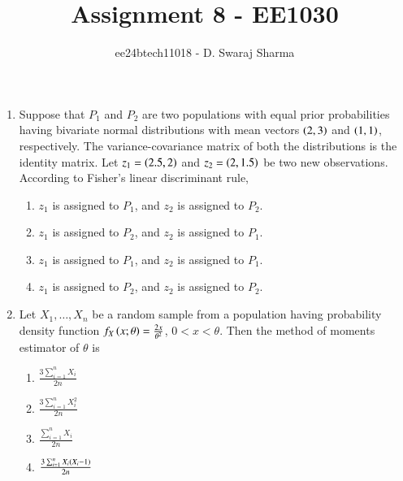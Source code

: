 \documentclass[journal]{IEEEtran}
\begin{document}

\vspace{3cm}

\title{Assignment 8 - EE1030}
\author{ee24btech11018 - D. Swaraj Sharma}

{\let\newpage\relax\maketitle}
\renewcommand{\thefigure}{\theenumi}
\renewcommand{\thetable}{\theenumi}
\setlength{\intextsep}{10pt}
\renewcommand{\thetable}{\theenumi}

\begin{enumerate}
	\item Suppose that $P_1$ and $P_2$ are two populations with equal prior probabilities having bivariate normal distributions with mean vectors $\left(2, 3\right)$ and $\left(1, 1\right)$, respectively. The variance-covariance matrix of both the distributions is the identity matrix. Let $z_1 = \left(2.5, 2\right)$ and $z_2 = \left(2, 1.5\right)$ be two new observations. According to Fisher's linear discriminant rule,
		\begin{enumerate}
			\item $z_1$ is assigned to $P_1$, and $z_2$ is assigned to $P_2$.
			\item $z_1$ is assigned to $P_2$, and $z_2$ is assigned to $P_1$.
			\item $z_1$ is assigned to $P_1$, and $z_2$ is assigned to $P_1$.
			\item $z_1$ is assigned to $P_2$, and $z_2$ is assigned to $P_2$.
		\end{enumerate}
	\item Let $ X_1, \dots, X_n $ be a random sample from a population having probability density function $ f_X\left(x; \theta\right) = \frac{2x}{\theta^2} $, $ 0 < x < \theta $. Then the method of moments estimator of $ \theta $ is
		\begin{enumerate}
			\item $\frac{3 \sum_{i=1}^{n} X_i}{2n}$
			\item $\frac{3 \sum_{i=1}^{n} X^2_i}{2n}$
			\item $\frac{\sum_{i=1}^{n} X_i}{2n}$
			\item $\frac{3 \sum_{i=1}^{n} X_i\left(X_i-1\right)}{2n}$
		\end{enumerate}

\end{enumerate}
\end{document}
